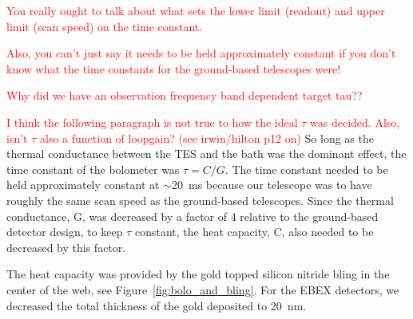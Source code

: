 \textcolor{red}{You really ought to talk about what sets the lower limit (readout) and upper limit (scan speed) on the time constant.}

\textcolor{red}{Also, you can't just say it needs to be held approximately constant if you don't know what the time constants for the ground-based telescopes were!}

\textcolor{red}{Why did we have an observation frequency band dependent target tau??}

\textcolor{red}{I think the following paragraph is not true to how the ideal $\tau$ was decided. Also, isn't $\tau$ also a function of loopgain? (see irwin/hilton p12 on)}
So long as the thermal conductance between the \ac{TES} and the bath was the dominant effect, the time constant of the bolometer was $\tau = C/G$. 
The time constant needed to be held approximately constant at $\sim$20~ms because our telescope was to have roughly the same scan speed as the ground-based telescopes. 
Since the thermal conductance, G, was decreased by a factor of 4 relative to the ground-based detector design, to keep $\tau$ constant, the heat capacity, C, also needed to be decreased by this factor. 

The heat capacity was provided by the gold topped silicon nitride bling in the center of the web, see Figure~\ref{fig:bolo_and_bling}. 
For the \ac{EBEX} detectors, we decreased the total thickness of the gold deposited to 20~nm. 







